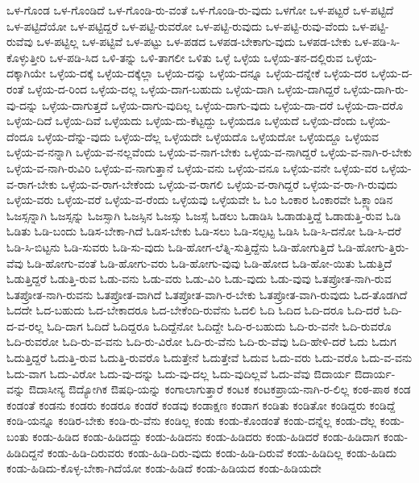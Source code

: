 {ಒಳ-ಗೊಂಡ
ಒಳ-ಗೊಂಡಿದೆ
ಒಳ-ಗೊಂಡಿ-ರು-ವಂತೆ
ಒಳ-ಗೊಂಡಿ-ರು-ವುದು
ಒಳಗೋ
ಒಳ-ಪಟ್ಟರೆ
ಒಳ-ಪಟ್ಟಿದೆ
ಒಳ-ಪಟ್ಟಿದೆಯೋ
ಒಳ-ಪಟ್ಟಿದ್ದರೆ
ಒಳ-ಪಟ್ಟಿ-ರುವರೋ
ಒಳ-ಪಟ್ಟಿ-ರುವುದು
ಒಳ-ಪಟ್ಟಿ-ರುವು-ವೆಂದು
ಒಳ-ಪಟ್ಟಿ-ರುವೆವು
ಒಳ-ಪಟ್ಟಿಲ್ಲ
ಒಳ-ಪಟ್ಟಿವೆ
ಒಳ-ಪಟ್ಟು
ಒಳ-ಪಡದ
ಒಳಪಡ-ಬೇಕಾಗು-ವುದು
ಒಳಪಡ-ಬೇಕು
ಒಳ-ಪಡಿ-ಸಿ-ಕೊಳ್ಳುತ್ತೀರಿ
ಒಳ-ಪಡಿ-ಸಿದ
ಒಳಿ-ತನ್ನು
ಒಳಿ-ತಾಗಲೀ
ಒಳಿತು
ಒಳ್ಳೆ
ಒಳ್ಳೆಯ
ಒಳ್ಳೆಯ-ತನ-ದಲ್ಲಿರುವ
ಒಳ್ಳೆಯ-ದಕ್ಕಾಗಿಯೇ
ಒಳ್ಳೆಯ-ದಕ್ಕೆ
ಒಳ್ಳೆಯ-ದಕ್ಕೆಲ್ಲಾ
ಒಳ್ಳೆಯ-ದನ್ನು
ಒಳ್ಳೆಯ-ದನ್ನೂ
ಒಳ್ಳೆಯ-ದನ್ನೇಕೆ
ಒಳ್ಳೆಯ-ದರ
ಒಳ್ಳೆಯ-ದ-ರಂತೆ
ಒಳ್ಳೆಯ-ದ-ರಿಂದ
ಒಳ್ಳೆಯ-ದಲ್ಲ
ಒಳ್ಳೆಯ-ದಾಗ-ಬಹುದು
ಒಳ್ಳೆಯ-ದಾಗಿ
ಒಳ್ಳೆಯ-ದಾಗಿದ್ದರೆ
ಒಳ್ಳೆಯ-ದಾಗಿ-ರು-ವು-ದನ್ನು
ಒಳ್ಳೆಯ-ದಾಗುತ್ತದೆ
ಒಳ್ಳೆಯ-ದಾಗು-ವುದಿಲ್ಲ
ಒಳ್ಳೆಯ-ದಾಗು-ವುದು
ಒಳ್ಳೆಯ-ದಾ-ದರೆ
ಒಳ್ಳೆಯ-ದಾ-ದರೊ
ಒಳ್ಳೆಯ-ದಿದೆ
ಒಳ್ಳೆಯ-ದಿವೆ
ಒಳ್ಳೆಯದು
ಒಳ್ಳೆಯ-ದು-ಕೆಟ್ಟದ್ದು
ಒಳ್ಳೆಯದೂ
ಒಳ್ಳೆಯದೆ
ಒಳ್ಳೆಯ-ದೆಂದು
ಒಳ್ಳೆಯ-ದೆಂದೂ
ಒಳ್ಳೆಯ-ದೆನ್ನು-ವುದು
ಒಳ್ಳೆಯ-ದೆಲ್ಲ
ಒಳ್ಳೆಯದೇ
ಒಳ್ಳೆಯದೊ
ಒಳ್ಳೆಯದೋ
ಒಳ್ಳೆಯದ್ದೂ
ಒಳ್ಳೆಯವ
ಒಳ್ಳೆಯ-ವ-ನನ್ನಾಗಿ
ಒಳ್ಳೆಯ-ವ-ನಲ್ಲವೆಂದು
ಒಳ್ಳೆಯ-ವ-ನಾಗ-ಬೇಕು
ಒಳ್ಳೆಯ-ವ-ನಾಗಿದ್ದರೆ
ಒಳ್ಳೆಯ-ವ-ನಾಗಿ-ರ-ಬೇಕು
ಒಳ್ಳೆಯ-ವ-ನಾಗಿ-ರುವಿರಿ
ಒಳ್ಳೆಯ-ವ-ನಾಗುತ್ತಾನೆ
ಒಳ್ಳೆಯ-ವನು
ಒಳ್ಳೆಯ-ವನೂ
ಒಳ್ಳೆಯ-ವನೇ
ಒಳ್ಳೆಯ-ವರ
ಒಳ್ಳೆಯ-ವ-ರಾಗ-ಬೇಕು
ಒಳ್ಳೆಯ-ವ-ರಾಗ-ಬೇಕೆಂದು
ಒಳ್ಳೆಯ-ವ-ರಾಗಲಿ
ಒಳ್ಳೆಯ-ವ-ರಾಗಿದ್ದರೆ
ಒಳ್ಳೆಯ-ವ-ರಾ-ಗಿ-ರುವುದು
ಒಳ್ಳೆಯ-ವರು
ಒಳ್ಳೆಯ-ವರೆ
ಒಳ್ಳೆಯ-ವ-ರೆಂದು
ಒಳ್ಳೆಯವು
ಒಳ್ಳೆಯವೇ
ಓ
ಓಂ
ಓಂಕಾರ
ಓಂಕಾರವೇ
ಓಕ್ಲ್ಯಾಂಡಿನ
ಓಜಸ್ಸನ್ನಾಗಿ
ಓಜಸ್ಸನ್ನು
ಓಜಸ್ಸಾಗಿ
ಓಜಸ್ಸಿನ
ಓಜಸ್ಸು
ಓಜಸ್ಸೆ
ಓಡಲು
ಓಡಾಡಿಸಿ
ಓಡಾಡುತ್ತಿದ್ದೆ
ಓಡಾಡುತ್ತಿ-ರುವ
ಓಡಿ
ಓಡಿತು
ಓಡಿ-ಬಂದು
ಓಡಿಸ-ಬೇಕಾ-ಗಿದೆ
ಓಡಿಸ-ಬೇಕು
ಓಡಿ-ಸಲು
ಓಡಿ-ಸಲ್ಪಟ್ಟ
ಓಡಿಸಿ
ಓಡಿ-ಸಿ-ದನೋ
ಓಡಿ-ಸಿ-ದರೆ
ಓಡಿ-ಸಿ-ಬಿಟ್ಟನು
ಓಡಿ-ಸುವರು
ಓಡಿ-ಸು-ವುದು
ಓಡಿ-ಹೋಗ-ಲೆತ್ನಿ-ಸುತ್ತಿದ್ದೆನು
ಓಡಿ-ಹೋಗುತ್ತಿದೆ
ಓಡಿ-ಹೋಗು-ತ್ತಿರು-ವೆವು
ಓಡಿ-ಹೋಗು-ವಂತೆ
ಓಡಿ-ಹೋಗು-ವರು
ಓಡಿ-ಹೋಗು-ವುವು
ಓಡಿ-ಹೋದ
ಓಡಿ-ಹೋ-ಯಿತು
ಓಡುತ್ತಿದೆ
ಓಡುತ್ತಿದ್ದರೆ
ಓಡುತ್ತಿ-ರುವ
ಓಡು-ವನು
ಓಡು-ವರು
ಓಡು-ವಿರಿ
ಓಡು-ವುದು
ಓಡು-ವುವು
ಓತಪ್ರೋತ-ನಾಗಿ-ರುವ
ಓತಪ್ರೋತ-ನಾಗಿ-ರುವನು
ಓತಪ್ರೋತ-ವಾಗಿದೆ
ಓತಪ್ರೋತ-ವಾಗಿ-ರ-ಬೇಕು
ಓತಪ್ರೋತ-ವಾಗಿ-ರುವುದು
ಓದ-ತೊಡಗಿದೆ
ಓದದೇ
ಓದ-ಬಹುದು
ಓದ-ಬೇಕಾದರೂ
ಓದ-ಬೇಕೆಂದಿ-ರುವೆನು
ಓದಲಿ
ಓದಿ
ಓದಿದ
ಓದಿ-ದರೂ
ಓದಿ-ದರೆ
ಓದಿ-ದ-ವ-ರಲ್ಲ
ಓದಿ-ದಾಗ
ಓದಿದೆ
ಓದಿದ್ದರೂ
ಓದಿದ್ದೆನೋ
ಓದಿದ್ದೇ
ಓದಿ-ರ-ಬಹುದು
ಓದಿ-ರು-ವನೇ
ಓದಿ-ರುವರೊ
ಓದಿ-ರುವರೋ
ಓದಿ-ರು-ವ-ವನು
ಓದಿ-ರು-ವಿರೋ
ಓದಿ-ರು-ವೆನು
ಓದಿ-ರು-ವೆವು
ಓದಿ-ಹೇಳಿ-ದರೆ
ಓದು
ಓದುಗ
ಓದುತ್ತಿದ್ದರೆ
ಓದುತ್ತಿ-ರುವ
ಓದುತ್ತಿ-ರುವರೊ
ಓದುತ್ತೇನೆ
ಓದುತ್ತೇವೆ
ಓದುವ
ಓದು-ವರು
ಓದು-ವರೊ
ಓದು-ವ-ವನು
ಓದು-ವಾಗ
ಓದು-ವಿರೋ
ಓದು-ವು-ದನ್ನು
ಓದು-ವು-ದಲ್ಲ
ಓದು-ವುದಿಲ್ಲವೆ
ಓದು-ವೆವು
ಔದಾರ್ಯ
ಔದಾರ್ಯ-ವನ್ನು
ಔದಾಸೀನ್ಯ
ಔದ್ಯೋಗಿಕ
ಔಷಧಿ-ಯನ್ನು
ಕಂಗಾಲಾಗುತ್ತಾರೆ
ಕಂಟಕ
ಕಂಟಕಪ್ರಾಯ-ನಾಗಿ-ರ-ಲಿಲ್ಲ
ಕಂಠ-ಪಾಠ
ಕಂಡ
ಕಂಡಂತೆ
ಕಂಡನು
ಕಂಡರು
ಕಂಡರೂ
ಕಂಡರೆ
ಕಂಡವು
ಕಂಡಾಕ್ಷಣ
ಕಂಡಾಗ
ಕಂಡಿತು
ಕಂಡಿತೋ
ಕಂಡಿದ್ದರು
ಕಂಡಿದ್ದೆ
ಕಂಡಿ-ಯನ್ನೂ
ಕಂಡಿರ-ಬೇಕು
ಕಂಡಿ-ರು-ವೆನು
ಕಂಡಿಲ್ಲ
ಕಂಡು
ಕಂಡು-ಕೊಂಡಂತೆ
ಕಂಡು-ದನ್ನೆಲ್ಲ
ಕಂಡು-ದೆಲ್ಲ
ಕಂಡು-ಬಂತು
ಕಂಡು-ಹಿಡಿದ
ಕಂಡು-ಹಿಡಿದದ್ದು
ಕಂಡು-ಹಿಡಿದನು
ಕಂಡು-ಹಿಡಿದರು
ಕಂಡು-ಹಿಡಿದರೆ
ಕಂಡು-ಹಿಡಿದಾಗ
ಕಂಡು-ಹಿಡಿದಿದ್ದನೆ
ಕಂಡು-ಹಿಡಿ-ದಿರುವರು
ಕಂಡು-ಹಿಡಿ-ದಿರು-ವುದು
ಕಂಡು-ಹಿಡಿ-ದಿರುವೆ
ಕಂಡು-ಹಿಡಿದಿಲ್ಲ
ಕಂಡು-ಹಿಡಿದು
ಕಂಡು-ಹಿಡಿದು-ಕೊಳ್ಳ-ಬೇಕಾ-ಗಿದೆಯೋ
ಕಂಡು-ಹಿಡಿದೆ
ಕಂಡು-ಹಿಡಿಯದ
ಕಂಡು-ಹಿಡಿಯದೇ
}
